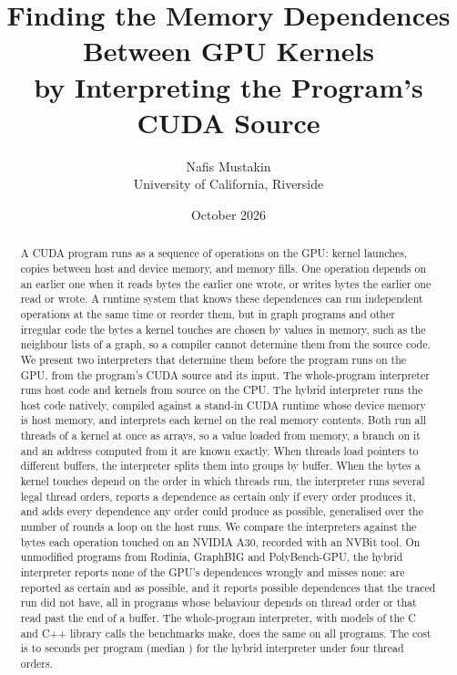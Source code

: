 \documentclass[11pt]{article}
\title{Finding the Memory Dependences Between GPU Kernels\\by Interpreting the Program's CUDA Source}
\author{Nafis Mustakin\\University of California, Riverside}
\date{October 2026}
\begin{document}
\maketitle



\begin{abstract}
A CUDA program runs as a sequence of operations on the GPU: kernel launches, copies between host and device
memory, and memory fills. One operation depends on an earlier one when it reads bytes the earlier one wrote, or
writes bytes the earlier one read or wrote. A runtime system that knows these dependences can run independent
operations at the same time or reorder them, but in graph programs and other irregular code the bytes a kernel
touches are chosen by values in memory, such as the neighbour lists of a graph, so a compiler cannot determine them
from the source code. We present two interpreters that determine them before the program runs on the GPU, from the
program's CUDA source and its input. The whole-program interpreter runs host code and kernels from source on the
CPU. The hybrid interpreter runs the host code natively, compiled against a stand-in CUDA runtime whose device
memory is host memory, and interprets each kernel on the real memory contents. Both run all threads of a kernel at
once as arrays, so a value loaded from memory, a branch on it and an address computed from it are known exactly.
When threads load pointers to different buffers, the interpreter splits them into groups by buffer. When the bytes a
kernel touches depend on the order in which threads run, the interpreter runs several legal thread orders, reports a
dependence as certain only if every order produces it, and adds every dependence any order could produce as
possible, generalised over the number of rounds a loop on the host runs. We compare the interpreters against the
bytes each operation touched on an NVIDIA A30, recorded with an NVBit tool. On \numBenchHyDone{} unmodified programs
from Rodinia, GraphBIG and PolyBench-GPU, the hybrid interpreter reports none of the GPU's \numBenchHyTruth{}
dependences wrongly and misses none: \numBenchHyCertTP{} are reported as certain and \numBenchHyPossYes{} as possible,
and it reports \numBenchHyPossNo{} possible dependences that the traced run did not have, all in programs whose
behaviour depends on thread order or that read past the end of a buffer. The whole-program interpreter, with models
of the C and C++ library calls the benchmarks make, does the same on all \numBenchFuDone{} programs. The cost is \numBenchHyTimeLo{} to
\numBenchHyTimeHi{} seconds per program (median \numBenchHyTimeMedian{}) for the hybrid interpreter under four
thread orders.
\end{abstract}
\end{document}

